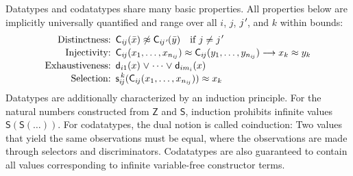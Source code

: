 \documentclass[letter]{article}
\theoremstyle{plain}
\theoremstyle{definition}
\newcommand\jPrime{j\vthinspace'\negvthinspace}
\newcommand\const[1]{\textsf{#1}}
\newcommand\medrightarrow{\mathrel{{{\color{black}\relbar}\kern-0.9ex\rlap{\color{white}\ensuremath{\blacksquare}}\kern-0.9ex}\joinrel{\color{black}\rightarrow}}}
\newcommand{\teq}{\approx}
\newcommand{\tneq}{\not\teq}
\newcommand\vthinspace{\kern+0.083333em}
\newcommand\negvthinspace{\kern-0.083333em}
\begin{document}
Datatypes and codatatypes share many basic properties. All properties
below are implicitly universally quantified and range over all $i$, $j$,
$\jPrime$, and $k$ within bounds:
%
\[
\!\begin{aligned}[t]
\text{Distinctness:}\enskip
  & %
    \smash{\const{C}_{i\negvthinspace j}(\bar x) \tneq \const{C}_{i\negvthinspace \jPrime}(\bar y) \quad\text{if $j \not= \jPrime$}}
  \\[-0.5\jot]
\text{Injectivity:}\enskip
  & %
    \smash{\const{C}_{i\negvthinspace j}(x_1,\dotsc,x_{n_{i\negvthinspace j}}) \teq \const{C}_{i\negvthinspace j}(y_1,\dotsc,y_{n_{i\negvthinspace j}}) \medrightarrow x_k \teq y_k}
  \\[-0.5\jot]
\text{Exhaustiveness:}\enskip
  & \smash{\const{d}_{i1}(x) \mathrel\lor \cdots \mathrel\lor \const{d}_{im_i}(x)}
  \\[-0.5\jot]
\text{Selection:}\enskip
  & \smash{\const{s}_{i\negvthinspace j}^{\,k}(\const{C}_{i\negvthinspace j}(x_1,\dotsc,x_{n_{i\negvthinspace j}})) \teq x_k}
\end{aligned}
\]
%
%
%
%
%
Datatypes are additionally characterized by an induction principle.
For the natural numbers constructed from $\const{Z}$ and $\const{S}$,
induction prohibits infinite values $\const{S}(\const{S}(\ldots))$.
%
For codatatypes, the dual notion is called coinduction:
Two values that yield the same observations must be equal, 
where the observations are made through selectors and discriminators.
Codatatypes are also guaranteed to contain all values corresponding to 
infinite variable-free constructor terms.
\end{document}
